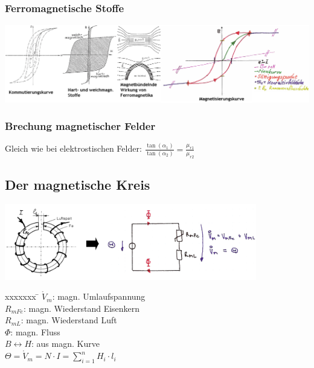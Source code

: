 \subsubsection{Ferromagnetische Stoffe}
\includegraphics[width=16cm]{./bilder/magnetisierung.png}

\subsubsection{Brechung magnetischer Felder}
	Gleich wie bei elektrostischen Felder: $\frac{\tan(\alpha_1)}{\tan(\alpha_2)} = 
		\frac{\mu_{r1}}{\mu_{r2}} $ 


\subsection{Der magnetische Kreis}
\begin{minipage}{11cm}
	\includegraphics[width=11cm]{./bilder/magnetischerkreis1.png}
\end{minipage}
\hfill
\begin{minipage}{7cm}
\begin{tabbing}
xxxxxxx \= \kill  
$\mathring{V}_m$: \>magn. Umlaufspannung\\
$R_{mFe}$:\> magn. Wiederstand Eisenkern\\
$R_{mL}$:\> magn. Wiederstand Luft\\
$\Phi$:\> magn. Fluss\\
$ B \leftrightarrow H$:\> aus magn. Kurve\\
$\Theta = \mathring{V}_m = N \cdot I = \sum\limits_{i=1}^n H_i \cdot l_i$
\end{tabbing}
\end{minipage}

